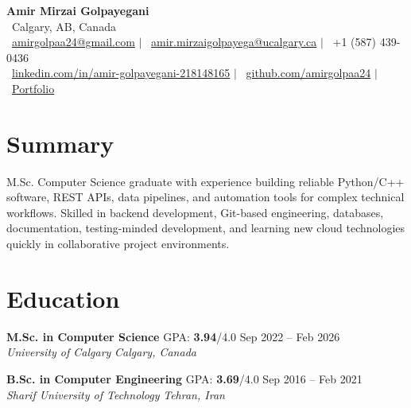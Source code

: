 \documentclass[a4paper,10pt]{article}
\newcommand{\resumeEducationSubheading}[5]{
    \textbf{#1} \hfill #2 \hfill #3 \\
    \textit{#4} \hfill \textit{#5}
}
\begin{document}

\begin{center}
    {\LARGE \textbf{Amir Mirzai Golpayegani}} \\[0.25em]
    \faMapMarker*~Calgary, AB, Canada \\[0.25em]
    \faEnvelope~\href{mailto:amirgolpaa24@gmail.com}{amirgolpaa24@gmail.com}
    $|$
    \faEnvelope~\href{mailto:amir.mirzaigolpayega@ucalgary.ca}{amir.mirzaigolpayega@ucalgary.ca}
    $|$
    \faPhone*~+1 (587) 439-0436 \\[0.25em]
    \faLinkedin~\href{https://linkedin.com/in/amir-golpayegani-218148165}{linkedin.com/in/amir-golpayegani-218148165}
    $|$
    \faGithub~\href{https://github.com/amirgolpaa24}{github.com/amirgolpaa24}
    $|$
    \faGlobe~\href{https://amir-portfolio-navy.vercel.app/}{Portfolio}
\end{center}


\section*{Summary}

M.Sc. Computer Science graduate with experience building reliable Python/C++ software, REST APIs, data pipelines, and automation tools for complex technical workflows. Skilled in backend development, Git-based engineering, databases, documentation, testing-minded development, and learning new cloud technologies quickly in collaborative project environments.


\section*{Education}

\resumeEducationSubheading
{M.Sc. in Computer Science}
{GPA: \textbf{3.94}/4.0}
{Sep 2022 -- Feb 2026}
{University of Calgary}
{Calgary, Canada}

\vspace{0.35em}

\resumeEducationSubheading
{B.Sc. in Computer Engineering}
{GPA: \textbf{3.69}/4.0}
{Sep 2016 -- Feb 2021}
{Sharif University of Technology}
{Tehran, Iran}

\end{document}
